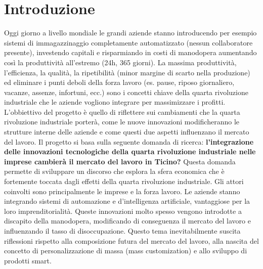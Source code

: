 \section{Introduzione}
Oggi giorno a livello mondiale le grandi aziende stanno introducendo per esempio sistemi di immagazzinaggio completamente automatizzato (nessun collaboratore presente), investendo capitali e risparmiando in costi di manodopera aumentando così la produttività all'estremo (24h, 365 giorni). La massima produttività, l'efficienza, la qualità, la ripetibilità (minor margine di scarto nella produzione) ed eliminare i punti deboli della forza lavoro (es. pause, riposo giornaliero, vacanze, assenze, infortuni, ecc.) sono i concetti chiave della quarta rivoluzione industriale che le aziende vogliono integrare per massimizzare i profitti.
L’obbiettivo del progetto è quello di riflettere sui cambiamenti che la quarta rivoluzione industriale porterà, come le nuove innovazioni modificheranno le strutture interne delle aziende e come questi due aspetti influenzano il mercato del lavoro. Il progetto si basa sulla seguente domanda di ricerca: \textbf{l’integrazione delle innovazioni tecnologiche della quarta rivoluzione industriale nelle imprese cambierà il mercato del lavoro in Ticino?}
Questa domanda permette di sviluppare un discorso che esplora la sfera economica che è fortemente toccata dagli effetti della quarta rivoluzione industriale. Gli attori coinvolti sono principalmente le imprese e la forza lavoro. Le aziende stanno integrando sistemi di automazione e d’intelligenza artificiale, vantaggiose per la loro imprenditorialità. Queste innovazioni molto spesso vengono introdotte a discapito della manodopera, modificando di conseguenza il mercato del lavoro e influenzando il tasso di disoccupazione. Questo tema inevitabilmente suscita riflessioni rispetto alla composizione futura del mercato del lavoro, alla nascita del concetto di personalizzazione di massa (mass customization) e allo sviluppo di prodotti smart.
